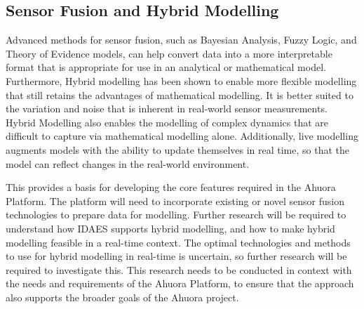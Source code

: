 \subsection{Sensor Fusion and Hybrid Modelling}

Advanced methods for sensor fusion, such as Bayesian Analysis, Fuzzy Logic, and Theory of Evidence models, can help convert data into a more interpretable format that is appropriate for use in an analytical or mathematical model. 
Furthermore, Hybrid modelling has been shown to enable more flexible modelling that still retains the advantages of mathematical modelling. 
It is better suited to the variation and noise that is inherent in real-world sensor measurements. 
Hybrid Modelling also enables the modelling of complex dynamics that are difficult to capture via mathematical modelling alone. 
Additionally, live modelling augments models with the ability to update themselves in real time, so that the model can reflect changes in the real-world environment.


This provides a basis for developing the core features required in the Ahuora Platform. The platform will need to incorporate existing or novel sensor fusion technologies to prepare data for modelling. 
Further research will be required to understand how IDAES supports hybrid modelling, and how to make hybrid modelling feasible in a real-time context.
The optimal technologies and methods to use for hybrid modelling in real-time is uncertain, so further research will be required to investigate this. 
This research needs to be conducted in context with the needs and requirements of the Ahuora Platform, to ensure that the approach also supports the broader goals of the Ahuora project.

